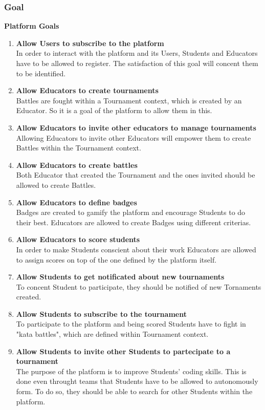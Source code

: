 \documentclass{article}
\begin{document}
\subsubsection{Goal}
\textbf{Platform Goals}
\begin{enumerate}[label=$\bullet$ \textbf{GP\arabic*:}]
    \item \textbf{Allow Users to subscribe to the platform}\\In order to interact with the platform and its Users, Students and Educators have to be allowed to register. The satisfaction of this goal will concent them to be identified.
    \item \textbf{Allow Educators to create tournaments}\\Battles are fought within a Tournament context, which is created by an Educator. So it is a goal of the platform to allow them in this. 
    \item \textbf{Allow Educators to invite other educators to manage tournaments}\\Allowing Educators to invite other Educators will empower them to create Battles within the Tournament context. 
    \item \textbf{Allow Educators to create battles}\\Both Educator that created the Tournament and the ones invited should be allowed to create Battles. 
    \item \textbf{Allow Educators to define badges}\\Badges are created to gamify the platform and encourage Students to do their best. Educators are allowed to create Badges using different criterias.
    \item \textbf{Allow Educators to score students}\\In order to make Students conscient about their work Educators are allowed to assign scores on top of the one defined by the platform itself.
    \item \textbf{Allow Students to get notificated about new tournaments}\\To concent Student to participate, they should be notified of new Tornaments created.
    \item \textbf{Allow Students to subscribe to the tournament}\\To participate to the platform and being scored Students have to fight in "kata battles", which are defined within Tournament context.
    \item \textbf{Allow Students to invite other Students to partecipate to a tournament}\\The purpose of the platform is to improve Students' coding skills. This is done even throught teams that Students have to be allowed to autonomously form. To do so, they should be able to search for other Students within the platform.
\end{enumerate}
\end{document}
